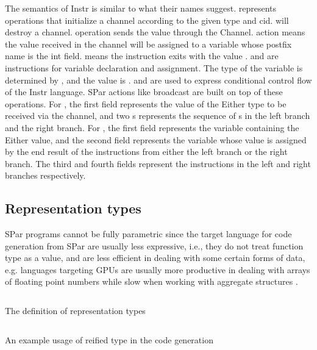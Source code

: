 The semantics of Instr is similar to what their names suggest.  represents operations that initialize a channel according to the given type and cid.  will destroy a channel.  operation sends the value  through the Channel.  action means the value received in the channel will be assigned to a variable whose postfix name is the int field.  means the instruction exits with the value .  and  are instructions for variable declaration and assignment. The type of the variable is determined by , and the value is .  and  are used to express conditional control flow of the Instr language. SPar actions like broadcast are built on top of these operations. For , the first field represents the value of the Either type to be received via the channel, and two s represents the sequence of s in the left branch and the right branch. For , the first field represents the variable containing the Either value, and the second field represents the variable whose value is assigned by the end result of the instructions from either the left branch or the right branch. The third and fourth fields represent the instructions in the left and right branches respectively.

\subsection{Representation types} \label{codegen:sec:repr}
SPar programs cannot be fully parametric since the target language for code generation from SPar are usually less expressive, i.e., they do not treat function type  as a value, and are less efficient in dealing with some certain forms of data, e.g. languages targeting GPUs are usually more productive in dealing with arrays of floating point numbers while slow when working with aggregate structures \cite{mcdonellTypesafeRuntimeCode2016}. 
\begin{listing}
    \inputminted{Haskell}{codegen/repr.hs}    
    \caption{The definition of representation types}
    \label{codegen:code:repr}
\end{listing}
\begin{listing}
    \inputminted{Haskell}{codegen/const.hs} 
    \caption{An example usage of reified type in the code generation}
    \label{codegen:code:const}
\end{listing}

